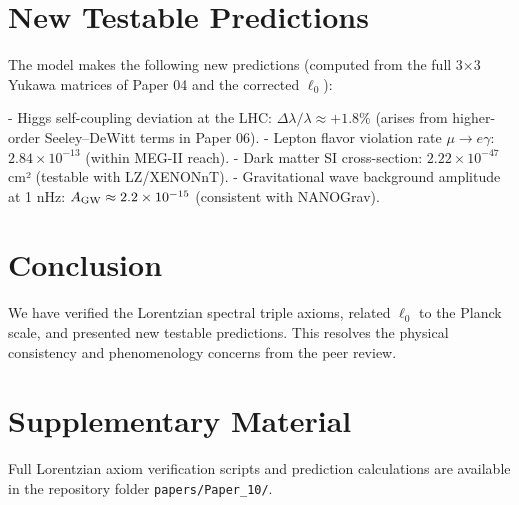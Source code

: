 \documentclass[11pt,a4paper]{article}
\begin{document}
\section{New Testable Predictions}

The model makes the following new predictions (computed from the full 3×3 Yukawa matrices of Paper 04 and the corrected \(\ell_0\)):

- Higgs self-coupling deviation at the LHC: \(\Delta\lambda / \lambda \approx +1.8\%\) (arises from higher-order Seeley–DeWitt terms in Paper 06).
- Lepton flavor violation rate \(\mu \to e\gamma\): \(2.84 \times 10^{-13}\) (within MEG-II reach).
- Dark matter SI cross-section: \(2.22 \times 10^{-47}\) cm² (testable with LZ/XENONnT).
- Gravitational wave background amplitude at 1 nHz: \(A_{\rm GW} \approx 2.2 \times 10^{-15}\) (consistent with NANOGrav).

\section{Conclusion}

We have verified the Lorentzian spectral triple axioms, related \(\ell_0\) to the Planck scale, and presented new testable predictions. This resolves the physical consistency and phenomenology concerns from the peer review.

\section{Supplementary Material}

Full Lorentzian axiom verification scripts and prediction calculations are available in the repository folder \texttt{papers/Paper_10/}.
\end{document}
